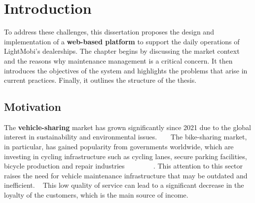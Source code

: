 \chapter{Introduction}%
\label{chapter:introduction}

\begin{introduction}

To address these challenges, this dissertation proposes the design and implementation of a \textbf{web-based platform} to support the daily operations of LightMobi's dealerships. The chapter begins by discussing the market context and the reasons why maintenance management is a critical concern. It then introduces the objectives of the system and highlights the problems that arise in current practices. Finally, it outlines the structure of the thesis.

\end{introduction} 


\section{Motivation}

The \textbf{vehicle-sharing} market has grown significantly since 2021 due to the global interest in sustainability and environmental issues. ~\cite{cohesionOpenData} ~\cite{bike_data_businessresearch}
The bike-sharing market, in particular, has gained popularity from governments worldwide, which are investing in cycling infrastructure such as cycling lanes, secure parking facilities, bicycle production and repair industries ~\cite{Clercq2023} ~\cite{Cerro2024} ~\cite{European_declararion_on_cycling} ~\cite{bike_data_businessresearch} ~\cite{cohesionOpenData}.
This attention to this sector raises the need for vehicle maintenance infrastructure that may be outdated and inefficient. ~\cite{MAS_MOTORS}
This low quality of service can lead to a significant decrease in the loyalty of the customers, which is the main source of income. ~\cite{Setting_the_after_sale_process}

